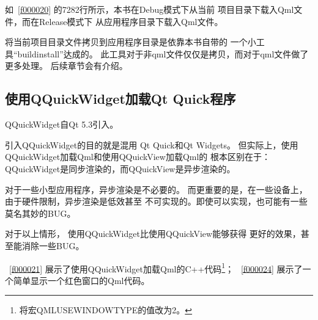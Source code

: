 如\filesourcenumbernameone\ \ref{f000020}
的72\raisebox{0.16ex}{\sourcefonttwo\~{}}82行所示，本书在Debug模式下从当前
项目目录下载入Qml文件，而在Release模式下
从应用程序目录下载入Qml文件。

将当前项目目录文件拷贝到应用程序目录是依靠本书自带的
一个小工具“build\underline{\hspace{0.5em}}install”达成的。
此工具对于非qml文件仅仅是拷贝，而对于qml文件做了更多处理。
后续章节会有介绍。

\FloatBarrier
\subsection{
使用QQuickWidget加载Qt Quick程序
}\label{ss001110}


QQuickWidget自Qt 5.3引入。

引入QQuickWidget的目的就是混用
Qt Quick和Qt Widgets。
但实际上，使用QQuickWidget加载Qml和使用QQuickView加载Qml的
根本区别在于：
QQuickWidget是同步渲染的，而QQuickView是异步渲染的。

对于一些小型应用程序，异步渲染是不必要的。
而更重要的是，在一些设备上，由于硬件限制，异步渲染是低效甚至
不可实现的。即使可以实现，也可能有一些莫名其妙的BUG。

对于以上情形，
使用QQuickWidget比使用QQuickView能够获得
更好的效果，甚至能消除一些BUG。

\filesourcenumbernameone\ \ref{f000021}
展示了使用QQuickWidget加载Qml的C{\sourcefonttwo{}+}{\sourcefonttwo{}+}代码\footnote{
将宏QML\underline{\hspace{0.5em}}USE\underline{\hspace{0.5em}}WINDOW\underline{\hspace{0.5em}}TYPE的值改为2。
}；
\filesourcenumbernameone\ \ref{f000024}
展示了一个简单显示一个红色窗口的Qml代码。

